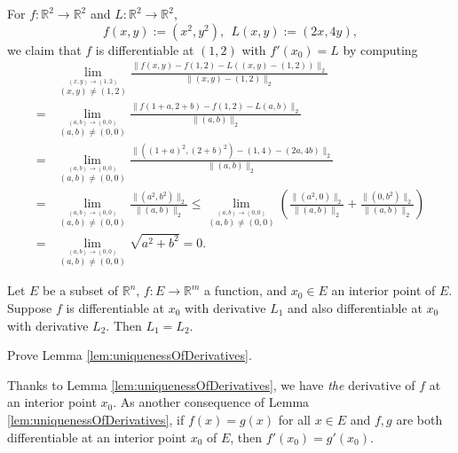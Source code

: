 \begin{exm}
  For $f: \mathbb{R}^2\rightarrow \mathbb{R}^2$
  and $L: \mathbb{R}^2\rightarrow \mathbb{R}^2$,
  \begin{equation}
    \label{eq:fSqaureComp}
    f(x,y):=(x^2, y^2), \ \ L(x,y):=(2x, 4y), 
  \end{equation}
  we claim that $f$ is differentiable at $(1,2)$
  with \mbox{$f'(x_0)=L$} by computing
  \begin{align*}
    &\lim_{\stackrel{(x,y)\rightarrow (1,2)}{(x,y)\ne(1,2)}}
    \frac{\|f(x,y)- f(1,2) - L((x,y)-(1,2))\|_2}{\|(x,y)-(1,2)\|_2}
      \\
    =&\lim_{\stackrel{(a,b)\rightarrow (0,0)}{(a,b)\ne(0,0)}}
    \frac{\|f(1+a,2+b)- f(1,2) - L(a,b)\|_2}{\|(a,b)\|_2}
      \\
    =&\lim_{\stackrel{(a,b)\rightarrow (0,0)}{(a,b)\ne(0,0)}}
    \frac{\|\left((1+a)^2,(2+b)^2\right)- (1,4) - (2a,4b)\|_2}{\|(a,b)\|_2}
      \\
    =&\lim_{\stackrel{(a,b)\rightarrow (0,0)}{(a,b)\ne(0,0)}}
    \frac{\|(a^2, b^2)\|_2}{\|(a,b)\|_2}
    \le \lim_{\stackrel{(a,b)\rightarrow (0,0)}{(a,b)\ne(0,0)}}
          \left(\frac{\|(a^2, 0)\|_2}{\|(a,b)\|_2}
          +  \frac{\|(0, b^2)\|_2}{\|(a,b)\|_2}\right)
      \\
    = &\lim_{\stackrel{(a,b)\rightarrow (0,0)}{(a,b)\ne(0,0)}}
        \sqrt{a^2 + b^2}
    = 0.
  \end{align*}
\end{exm}

\begin{lem}
  \label{lem:uniquenessOfDerivatives}
  Let $E$ be a subset of $\mathbb{R}^n$,
  $f: E\rightarrow \mathbb{R}^m$ a function,
  and $x_0\in E$ an interior point of $E$.
  Suppose $f$ is differentiable at $x_0$ with derivative $L_1$
  and also differentiable at $x_0$ with derivative $L_2$.
  Then $L_1=L_2$.
\end{lem}

\begin{exc}
  Prove Lemma \ref{lem:uniquenessOfDerivatives}.
\end{exc}

\begin{rem}
  Thanks to Lemma \ref{lem:uniquenessOfDerivatives},
  we have \emph{the} derivative of $f$ at an interior point $x_0$.
  As another consequence of Lemma \ref{lem:uniquenessOfDerivatives},
  if $f(x)=g(x)$ for all $x\in E$
  and $f,g$ are both differentiable at an interior point $x_0$ of $E$,
  then $f'(x_0)=g'(x_0)$.
\end{rem}

